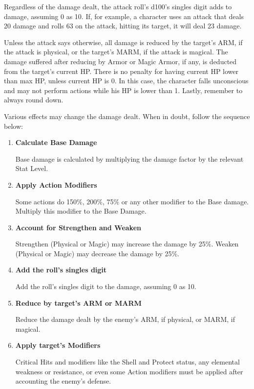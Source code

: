 \begin{multicols}{2}
Regardless of the damage dealt, the attack roll’s d100’s singles digit adds to damage, assuming 0 as 10. If, for example, a character uses an attack that deals 20 damage and rolls 63 on the attack, hitting its target, it will deal 23 damage.

Unless the attack says otherwise, all damage is reduced by the target's ARM, if the attack is physical, or the target’s MARM, if the attack is magical. The damage suffered after reducing by Armor or Magic Armor, if any, is deducted from the target’s current HP\@. There is no penalty for having current HP lower than max HP, unless current HP is 0. In this case, the character falls unconscious and may not perform actions while his HP is lower than 1. Lastly, remember to always round down.

Various effects may change the damage dealt. When in doubt, follow the sequence below:
\begin{enumerate}
\item \textbf{Calculate Base Damage}

Base damage is calculated by multiplying the damage factor by the relevant Stat Level.

\item \textbf{Apply Action Modifiers}

Some actions do 150\%, 200\%, 75\% or any other modifier to the Base damage. Multiply this modifier to the Base Damage.

\item \textbf{Account for Strengthen and Weaken}

Strengthen (Physical or Magic) may increase the damage by 25\%. Weaken (Physical or Magic) may decrease the damage by 25\%.

\item \textbf{Add the roll's singles digit}

Add the roll's singles digit to the damage, assuming 0 as 10.

\item \textbf{Reduce by target's ARM or MARM}

Reduce the damage dealt by the enemy's ARM, if physical, or MARM, if magical.

\item \textbf{Apply target's Modifiers}

Critical Hits and modifiers like the Shell and Protect status, any elemental weakness or resistance, or even some Action modifiers must be applied after accounting the enemy's defense.
\end{enumerate}


\end{multicols}
